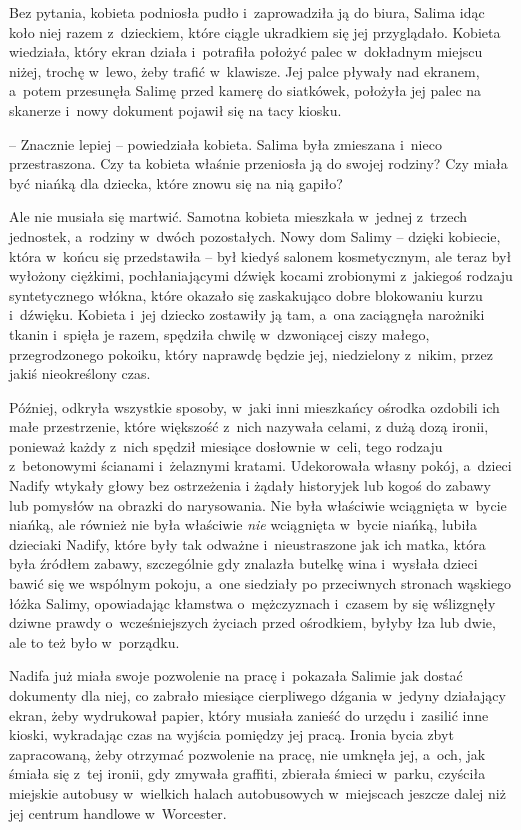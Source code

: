 \documentclass[oneside,polish,11pt,sfheadings]{mwbk}
\begin{document}
Bez pytania, kobieta podniosła pudło i~zaprowadziła ją do biura, Salima
idąc koło niej razem z~dzieckiem, które ciągle ukradkiem się jej
przyglądało. Kobieta wiedziała, który ekran działa i~potrafiła położyć
palec w~dokładnym miejscu niżej, trochę w~lewo, żeby trafić w~klawisze.
Jej palce pływały nad ekranem, a~potem przesunęła Salimę przed kamerę do
siatkówek, położyła jej palec na skanerze i~nowy dokument pojawił się na
tacy kiosku.

-- Znacznie lepiej -- powiedziała kobieta. Salima była zmieszana i~nieco
przestraszona. Czy ta kobieta właśnie przeniosła ją do swojej rodziny?
Czy miała być niańką dla dziecka, które znowu się na nią gapiło?

Ale nie musiała się martwić. Samotna kobieta mieszkała w~jednej z~trzech
jednostek, a~rodziny w~dwóch pozostałych. Nowy dom Salimy -- dzięki
kobiecie, która w~końcu się przedstawiła -- był kiedyś salonem
kosmetycznym, ale teraz był wyłożony ciężkimi, pochłaniającymi dźwięk
kocami zrobionymi z~jakiegoś rodzaju syntetycznego włókna, które okazało
się zaskakująco dobre blokowaniu kurzu i~dźwięku. Kobieta i~jej dziecko
zostawiły ją tam, a~ona zaciągnęła narożniki tkanin i~spięła je razem,
spędziła chwilę w~dzwoniącej ciszy małego, przegrodzonego pokoiku, który
naprawdę będzie jej, niedzielony z~nikim, przez jakiś nieokreślony czas.

Później, odkryła wszystkie sposoby, w~jaki inni mieszkańcy ośrodka
ozdobili ich małe przestrzenie, które większość z~nich nazywała celami,
z dużą dozą ironii, ponieważ każdy z~nich spędził miesiące dosłownie w~celi, tego rodzaju z~betonowymi ścianami i~żelaznymi kratami.
Udekorowała własny pokój, a~dzieci Nadify wtykały głowy bez ostrzeżenia
i żądały historyjek lub kogoś do zabawy lub pomysłów na obrazki do
narysowania. Nie była właściwie wciągnięta w~bycie niańką, ale również
nie była właściwie \textit{nie }wciągnięta w~bycie niańką, lubiła
dzieciaki Nadify, które były tak odważne i~nieustraszone jak ich matka,
która była źródłem zabawy, szczególnie gdy znalazła butelkę wina i~wysłała dzieci bawić się we wspólnym pokoju, a~one siedziały po
przeciwnych stronach wąskiego łóżka Salimy, opowiadając kłamstwa o~mężczyznach i~czasem by się wślizgnęły dziwne prawdy o~wcześniejszych
życiach przed ośrodkiem, byłyby łza lub dwie, ale to też było w~porządku.

Nadifa już miała swoje pozwolenie na pracę i~pokazała Salimie jak dostać
dokumenty dla niej, co zabrało miesiące cierpliwego dźgania w~jedyny
działający ekran, żeby wydrukował papier, który musiała zanieść do
urzędu i~zasilić inne kioski, wykradając czas na wyjścia pomiędzy jej
pracą. Ironia bycia zbyt zapracowaną, żeby otrzymać pozwolenie na pracę,
nie umknęła jej, a~och, jak śmiała się z~tej ironii, gdy zmywała
graffiti, zbierała śmieci w~parku, czyściła miejskie autobusy w~wielkich
halach autobusowych w~miejscach jeszcze dalej niż jej centrum handlowe w~Worcester.
\end{document}
